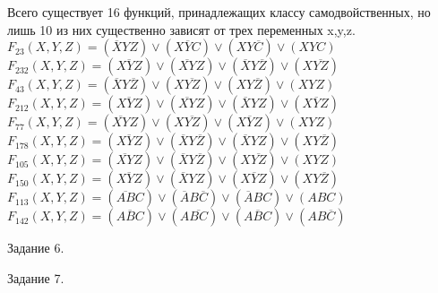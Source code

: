 \documentclass[a4paper,12pt]{report} %
\begin{document}
\begin{flushleft}
	Всего существует 16 функций, принадлежащих классу самодвойственных, но лишь 10 из них
	существенно зависят от трех переменных x,y,z.\\
	$F_{23}(X,Y,Z)=(\overline{X}YZ) \vee (X\overline{Y}C) \vee (XY\overline{C}) \vee (XYC)$\\
	$F_{232}(X,Y,Z)=(\overline{XYZ}) \vee (\overline{XY}Z) \vee (\overline{X}Y\overline{Z}) \vee (X\overline{YZ})$\\
	$F_{43}(X,Y,Z)=(\overline{X}Y\overline{Z}) \vee (X\overline{YZ}) \vee (XY\overline{Z}) \vee (XYZ)$\\
	$F_{212}(X,Y,Z)=(\overline{XYZ}) \vee (\overline{XY}Z) \vee (\overline{X}YZ) \vee (X\overline{Y}Z)$\\
	$F_{77}(X,Y,Z)=(\overline{XY}Z) \vee (X\overline{YZ}) \vee (X\overline{Y}Z) \vee (XYZ)$\\
	$F_{178}(X,Y,Z)=(\overline{XYZ}) \vee (\overline{X}Y\overline{Z}) \vee (\overline{X}YZ) \vee (XY\overline{Z})$\\
	$F_{105}(X,Y,Z)=(\overline{XY}Z) \vee (\overline{X}Y\overline{Z}) \vee (X\overline{YZ})\vee (XYZ)$\\
	$F_{150}(X,Y,Z)=(\overline{XYZ}) \vee (\overline{X}YZ) \vee (X\overline{Y}Z) \vee (XY\overline{Z})$\\
	$F_{113}(X,Y,Z)=(\overline{AB}C) \vee (\overline{A}B\overline{C}) \vee (\overline{A}BC) \vee (ABC)$\\
	$F_{142}(X,Y,Z)=(\overline{ABC}) \vee (A\overline{BC}) \vee (A\overline{B}C) \vee (AB\overline{C})$\\
\end{flushleft}

\bigskip

\begin{center}
	Задание 6.\\
\end{center}

\begin{flushleft}
	
\end{flushleft}

\bigskip

\begin{center}
	Задание 7.\\
\end{center}
\end{document}
